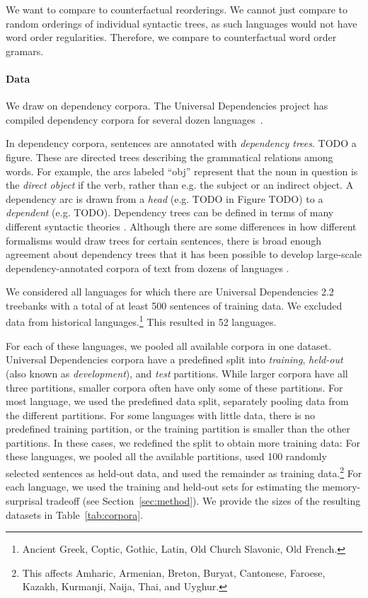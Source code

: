 \documentclass[11pt,letterpaper]{article}
\begin{document}
We want to compare to counterfactual reorderings.
We cannot just compare to random orderings of individual syntactic trees, as such languages would not have word order regularities.
Therefore, we compare to counterfactual word order gramars.

\paragraph{Data}
We draw on dependency corpora.
The Universal Dependencies project has compiled dependency corpora for several dozen languages~\citep{nivre-universal-2017}.

In dependency corpora, sentences are annotated with \emph{dependency trees}. TODO a figure.
These are directed trees describing the grammatical relations among words. For example, the arcs labeled ``obj'' represent that the noun in question is the \emph{direct object} if the verb, rather than e.g. the subject or an indirect object.
A dependency arc is drawn from a \emph{head} (e.g. TODO in Figure TODO) to a \emph{dependent} (e.g. TODO).
Dependency trees can be defined in terms of many different syntactic theories \cite{corbett1993heads}.
Although there are some differences in how different formalisms would draw trees for certain sentences, there is broad enough agreement about dependency trees that it has been possible to develop large-scale dependency-annotated corpora of text from dozens of languages \cite{nivre2017universal}.

We considered all languages for which there are Universal Dependencies 2.2 treebanks with a total of at least 500 sentences of training data.
We excluded data from historical languages.\footnote{Ancient Greek, Coptic, Gothic, Latin, Old Church Slavonic, Old French.}
This resulted in 52 languages.


For each of these languages, we pooled all available corpora in one dataset.
Universal Dependencies corpora have a predefined split into \emph{training}, \emph{held-out} (also known as \emph{development}), and \emph{test} partitions.
While larger corpora have all three partitions, smaller corpora often have only some of these partitions.
For most language, we used the predefined data split, separately pooling data from the different partitions. %
For some languages with little data, there is no predefined training partition, or the training partition is smaller than the other partitions.
In these cases, we redefined the split to obtain more training data:
For these languages, we pooled all the available partitions, used 100 randomly selected sentences as held-out data, and used the remainder as training data.\footnote{This affects Amharic, Armenian, Breton, Buryat, Cantonese, Faroese, Kazakh, Kurmanji, Naija, Thai, and Uyghur.}
For each language, we used the training and held-out sets for estimating the memory-surprisal tradeoff (see Section~\ref{sec:method}).
We provide the sizes of the resulting datasets in Table~\ref{tab:corpora}.
\end{document}
